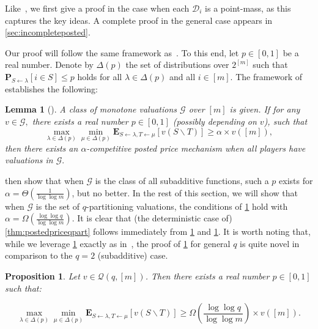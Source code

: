 \documentclass[11pt]{article}\usepackage{amsfonts}
\newtheorem{lemma}[theorem]{Lemma}
\newtheorem{proposition}[theorem]{Proposition}
\numberwithin{theorem}{subsection}
\newcommand{\prob}{\mathbf{P}}
\newcommand{\expect}{\mathbf{E}}
\begin{document}
Like~\cite{DuttingKL20}, we first give a proof in the case when each $\mathcal{D}_i$ is a point-mass, as this captures the key ideas. A complete proof in the general case appears in \cref{sec:incompleteposted}.

Our proof will follow the same framework as~\cite{DuttingKL20}. To this end, let $p \in [0,1]$ be a real number. Denote by $\Delta(p)$ the set of distributions over $2^{[m]}$ such that $\prob_{S\leftarrow \lambda}[i \in S]\le p$ holds for all $\lambda \in \Delta(p)$ and all 
$i \in [m]$. The framework of~\cite{DuttingKL20} establishes the following:

\begin{lemma}[{\cite[Eq. (6)]{DuttingKL20}}]
\label{lem:minimaxgame}
A class of monotone valuations $\mathcal{G}$ over $[m]$ is given. If for any $v\in \mathcal{G},$ there exists a real number $p \in [0,1]$ (possibly depending on $v$), such that 
$$
\max_{\lambda\in \Delta(p)}
\min_{\mu \in \Delta(p)}\expect_{S\leftarrow \lambda, T\leftarrow \mu}[v(S\backslash T)]\ge 
\alpha \times v([m]),
$$
then there exists an $\alpha$-competitive posted price mechanism when all players have valuations in $\mathcal{G}.$
\end{lemma}

\cite{DuttingKL20} then show that when $\mathcal{G}$ is the class of all subadditive functions, such a $p$ exists for \linebreak $\alpha = \Theta(\frac{1}{\log \log m})$, but no better. In the rest of this section, we will show that when $\mathcal{G}$ is the set of $q$-partitioning valuations, the conditions of 
\cref{lem:minimaxgame} hold with $\alpha = \Omega \left(\frac{\log \log q}{\log \log m}\right)$. It is clear that (the deterministic case of) \cref{thm:postedpriceqpart} follows immediately from \cref{lem:minimaxgame} and \cref{prop:qpartprobexists}. It is worth noting that, while we leverage \cref{lem:minimaxgame} exactly as in~\cite{DuttingKL20}, the proof of \cref{prop:qpartprobexists} for general $q$ is quite novel in comparison to the $q=2$ (subadditive) case.

\begin{proposition}\label{prop:qpartprobexists} Let $v \in \mathcal{Q}(q,[m])$. Then there exists a real number $p\in [0,1]$ such that:

$$\max_{\lambda\in \Delta(p)}
\min_{\mu \in \Delta(p)}\expect_{S\leftarrow \lambda, T\leftarrow \mu}[v(S\backslash T)]\ge
\Omega \left(\frac{\log \log q}{\log \log m}\right)\times v([m]).$$
\end{proposition}
\end{document}
